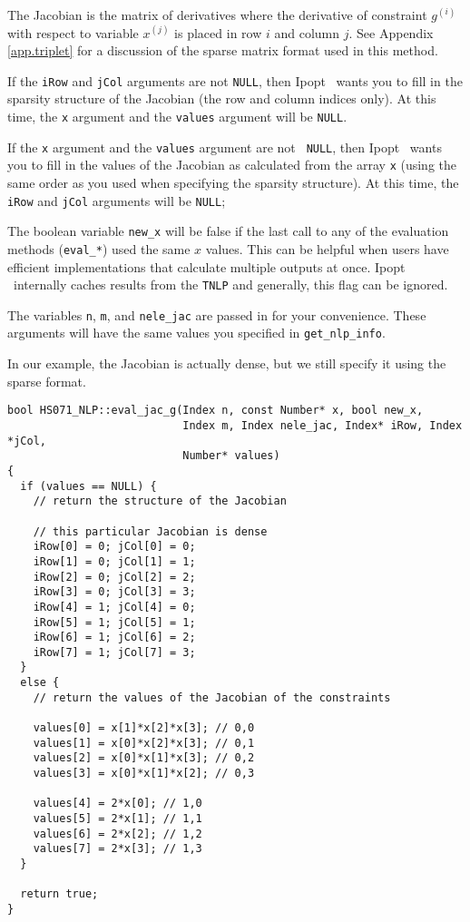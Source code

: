 \documentclass[10pt]{article}
\newcommand{\Ipopt}{{\sc Ipopt }}
\begin{document}
The Jacobian is the matrix of derivatives where the derivative of
constraint $g^{(i)}$ with respect to variable $x^{(j)}$ is placed in
row $i$ and column $j$. See Appendix \ref{app.triplet} for a
discussion of the sparse matrix format used in this method.

If the {\tt iRow} and {\tt jCol} arguments are not {\tt NULL}, then
\Ipopt\ wants you to fill in the sparsity structure of the Jacobian
(the row and column indices only). At this time, the {\tt x} argument
and the {\tt values} argument will be {\tt NULL}.

If the {\tt x} argument and the {\tt values} argument are not {\tt
  NULL}, then \Ipopt\ wants you to fill in the values of the Jacobian
as calculated from the array {\tt x} (using the same order as you used
when specifying the sparsity structure). At this time, the {\tt iRow}
and {\tt jCol} arguments will be {\tt NULL};

The boolean variable {\tt new\_x} will be false if the last call to
any of the evaluation methods ({\tt eval\_*}) used the same $x$
values. This can be helpful when users have efficient implementations
that calculate multiple outputs at once. \Ipopt\ internally caches
results from the {\tt TNLP} and generally, this flag can be ignored.

The variables {\tt n}, {\tt m}, and {\tt nele\_jac} are passed in for
your convenience. These arguments will have the same values you
specified in {\tt get\_nlp\_info}.

In our example, the Jacobian is actually dense, but we still
specify it using the sparse format.

\begin{footnotesize}
\begin{verbatim}
bool HS071_NLP::eval_jac_g(Index n, const Number* x, bool new_x,
                           Index m, Index nele_jac, Index* iRow, Index *jCol,
                           Number* values)
{
  if (values == NULL) {
    // return the structure of the Jacobian

    // this particular Jacobian is dense
    iRow[0] = 0; jCol[0] = 0;
    iRow[1] = 0; jCol[1] = 1;
    iRow[2] = 0; jCol[2] = 2;
    iRow[3] = 0; jCol[3] = 3;
    iRow[4] = 1; jCol[4] = 0;
    iRow[5] = 1; jCol[5] = 1;
    iRow[6] = 1; jCol[6] = 2;
    iRow[7] = 1; jCol[7] = 3;
  }
  else {
    // return the values of the Jacobian of the constraints
    
    values[0] = x[1]*x[2]*x[3]; // 0,0
    values[1] = x[0]*x[2]*x[3]; // 0,1
    values[2] = x[0]*x[1]*x[3]; // 0,2
    values[3] = x[0]*x[1]*x[2]; // 0,3

    values[4] = 2*x[0]; // 1,0
    values[5] = 2*x[1]; // 1,1
    values[6] = 2*x[2]; // 1,2
    values[7] = 2*x[3]; // 1,3
  }

  return true;
}
\end{verbatim}
\end{footnotesize}
\end{document}
